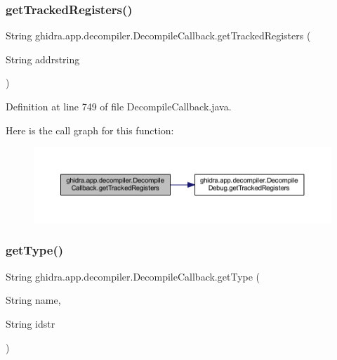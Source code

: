 \subsubsection{\texorpdfstring{getTrackedRegisters()}{getTrackedRegisters()}}
{\footnotesize\ttfamily String ghidra.\+app.\+decompiler.\+Decompile\+Callback.\+get\+Tracked\+Registers (\begin{DoxyParamCaption}\item[{String}]{addrstring }\end{DoxyParamCaption})\hspace{0.3cm}{\ttfamily [inline]}}



Definition at line 749 of file Decompile\+Callback.\+java.

Here is the call graph for this function\+:
\nopagebreak
\begin{figure}[H]
\begin{center}
\leavevmode
\includegraphics[width=350pt]{classghidra_1_1app_1_1decompiler_1_1_decompile_callback_a029ff53ae77f771cf7e3311c435a98fa_cgraph}
\end{center}
\end{figure}
\mbox{\label{classghidra_1_1app_1_1decompiler_1_1_decompile_callback_a6c420b7effd79c8fc02da2156f876dcc}} 
\subsubsection{\texorpdfstring{getType()}{getType()}}
{\footnotesize\ttfamily String ghidra.\+app.\+decompiler.\+Decompile\+Callback.\+get\+Type (\begin{DoxyParamCaption}\item[{String}]{name,  }\item[{String}]{idstr }\end{DoxyParamCaption})\hspace{0.3cm}{\ttfamily [inline]}}



